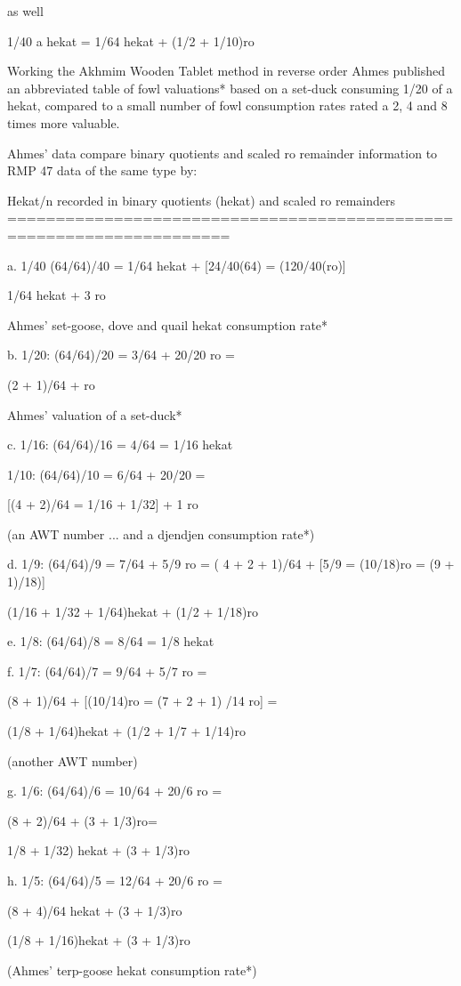 \documentclass[12pt]{article}
\begin{document}
as well

1/40 a hekat = 1/64 hekat + (1/2 + 1/10)ro

Working the Akhmim Wooden Tablet method in reverse order Ahmes published an abbreviated table of fowl valuations* based on a set-duck consuming 1/20 of a hekat, compared to a small number of fowl consumption rates rated a 2, 4 and 8 times more valuable.

Ahmes' data compare binary quotients and scaled ro remainder information to RMP 47 data of the same type by:

Hekat/n recorded in binary quotients (hekat) and scaled ro remainders
=====================================================================

a. 1/40 (64/64)/40 = 1/64 hekat + [24/40(64) = (120/40(ro)]   

1/64 hekat + 3 ro

Ahmes' set-goose, dove and quail hekat consumption rate*

b. 1/20: (64/64)/20 = 3/64 + 20/20 ro =

(2 + 1)/64 + ro

Ahmes' valuation of a set-duck*

c. 1/16: (64/64)/16 = 4/64 = 1/16 hekat

1/10: (64/64)/10 = 6/64 + 20/20 =

[(4 + 2)/64 = 1/16 + 1/32] + 1 ro

(an AWT number ... and a djendjen consumption rate*)

d. 1/9: (64/64)/9 = 7/64 + 5/9 ro = ( 4 + 2 + 1)/64 + [5/9 = (10/18)ro = (9 + 1)/18)]

(1/16 + 1/32 + 1/64)hekat + (1/2 + 1/18)ro

e. 1/8: (64/64)/8 = 8/64 = 1/8 hekat

f. 1/7: (64/64)/7 = 9/64 + 5/7 ro =

(8 + 1)/64 + [(10/14)ro = (7 + 2 + 1) /14 ro] =

(1/8 + 1/64)hekat + (1/2 + 1/7 + 1/14)ro

(another AWT number)

g. 1/6: (64/64)/6 = 10/64 + 20/6 ro =

(8 + 2)/64 + (3 + 1/3)ro=

1/8 + 1/32) hekat + (3 + 1/3)ro

h. 1/5: (64/64)/5 = 12/64 + 20/6 ro =

(8 + 4)/64 hekat + (3 + 1/3)ro

(1/8 + 1/16)hekat + (3 + 1/3)ro

(Ahmes' terp-goose hekat consumption rate*)
\end{document}
